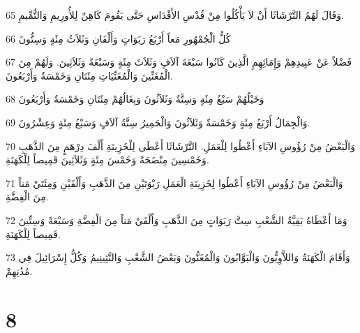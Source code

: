 \par 65 وَقَالَ لَهُمُ التَّرْشَاثَا أَنْ لاَ يَأْكُلُوا مِنْ قُدْسِ الأَقْدَاسِ حَتَّى يَقُومَ كَاهِنٌ لِلأُورِيمِ وَالتُّمِّيمِ.
\par 66 كُلُّ الْجُمْهُورِ مَعاً أَرْبَعُ رَبَوَاتٍ وَأَلْفَانِ وَثَلاَثُ مِئَةٍ وَسِتُّونَ
\par 67 فَضْلاً عَنْ عَبِيدِهِمْ وَإِمَائِهِمِ الَّذِينَ كَانُوا سَبْعَةَ آلاَفٍ وَثَلاَثَ مِئَةٍ وَسَبْعَةً وَثَلاَثِينَ. وَلَهُمْ مِنَ الْمُغَنِّينَ وَالْمُغَنِّيَاتِ مِئَتَانِ وَخَمْسَةٌ وَأَرْبَعُونَ.
\par 68 وَخَيْلُهُمْ سَبْعُ مِئَةٍ وَسِتَّةٌ وَثَلاَثُونَ وَبِغَالُهُمْ مِئَتَانِ وَخَمْسَةٌ وَأَرْبَعُونَ
\par 69 وَالْجِمَالُ أَرْبَعُ مِئَةٍ وَخَمْسَةٌ وَثَلاَثُونَ وَالْحَمِيرُ سِتَّةُ آلاَفٍ وَسَبْعُ مِئَةٍ وَعِشْرُونَ.
\par 70 وَالْبَعْضُ مِنْ رُؤُوسِ الآبَاءِ أَعْطُوا لِلْعَمَلِ. التَّرْشَاثَا أَعْطَى لِلْخَزِينَةِ أَلْفَ دِرْهَمٍ مِنَ الذَّهَبِ وَخَمْسِينَ مِنْضَحَةً وَخَمْسَ مِئَةٍ وَثَلاَثِينَ قَمِيصاً لِلْكَهَنَةِ.
\par 71 وَالْبَعْضُ مِنْ رُؤُوسِ الآبَاءِ أَعْطُوا لِخَزِينَةِ الْعَمَلِ رَبْوَتَيْنِ مِنَ الذَّهَبِ وَأَلْفَيْنِ وَمِئَتَيْ مَناً مِنَ الْفِضَّةِ.
\par 72 وَمَا أَعْطَاهُ بَقِيَّةُ الشَّعْبِ سِتَّ رَبَوَاتٍ مِنَ الذَّهَبِ وَأَلْفَيْ مَناً مِنَ الْفِضَّةِ وَسَبْعَةً وَسِتِّينَ قَمِيصاً لِلْكَهَنَةِ.
\par 73 وَأَقَامَ الْكَهَنَةُ وَاللاَّوِيُّونَ وَالْبَوَّابُونَ وَالْمُغَنُّونَ وَبَعْضُ الشَّعْبِ وَالنَّثِينِيمُ وَكُلُّ إِسْرَائِيلَ فِي مُدُنِهِمْ.

\chapter{8}

